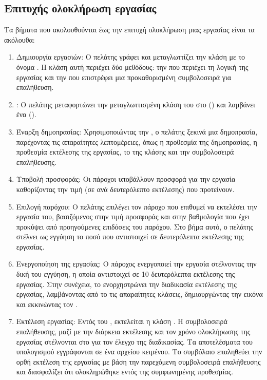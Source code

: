 \subsection{Επιτυχής ολοκλήρωση εργασίας }
Τα βήματα που ακολουθούνται έως την επιτυχή ολοκλήρωση μιας εργασίας είναι τα ακόλουθα:
\begin{enumerate}
    \item Δημιουργία εργασιών: Ο πελάτης γράφει και μεταγλωττίζει την κλάση  με το όνομα \textit{}. Η κλάση αυτή περιέχει δύο  μεθόδους: την \textit{} που περιέχει τη λογική της εργασίας και την \textit{} που επιστρέφει μια προκαθορισμένη συμβολοσειρά για επαλήθευση.
    \item {}: Ο πελάτης μεταφορτώνει την μεταγλωττισμένη κλάση του στο  () και λαμβάνει ένα  ().
    \item Έναρξη δημοπρασίας: Χρησιμοποιώντας την , ο πελάτης ξεκινά μια δημοπρασία, παρέχοντας τις απαραίτητες λεπτομέρειες, όπως η προθεσμία της δημοπρασίας, η προθεσμία εκτέλεσης της εργασίας, το  της  κλάσης και την συμβολοσειρά επαλήθευσης.
    \item Υποβολή προσφοράς: Οι πάροχοι υποβάλλουν προσφορά για την εργασία καθορίζοντας την τιμή (σε  ανά δευτερόλεπτο εκτέλεσης) που προτείνουν.
    \item Επιλογή παρόχου: Ο πελάτης επιλέγει τον πάροχο που επιθυμεί να εκτελέσει την εργασία του, βασιζόμενος στην τιμή προσφοράς και στην βαθμολογία που έχει προκύψει από προηγούμενες επιδόσεις του παρόχου. Στο βήμα αυτό, ο πελάτης στέλνει ως εγγύηση το ποσό που αντιστοιχεί σε  δευτερόλεπτα εκτέλεσης της εργασίας.
    \item Ενεργοποίηση της εργασίας: Ο πάροχος ενεργοποιεί την εργασία στέλνοντας την δική του εγγύηση, η οποία αντιστοιχεί σε 10 δευτερόλεπτα εκτέλεσης της εργασίας. Στην συνέχεια, το  ενορχηστρώνει την διαδικασία εκτέλεσης της εργασίας, λαμβάνοντας από το  τις απαραίτητες κλάσεις, δημιουργώντας την εικόνα \textit{} και εκκινώντας τον .
    \item Εκτέλεση εργασίας: Εντός του , εκτελείται η κλάση . Η συμβολοσειρά επαλήθευσης, μαζί με την διάρκεια εκτέλεσης και τον χρόνο ολοκλήρωσης της εργασίας στέλνονται στο  \textit{} για τον έλεγχο της διαδικασίας. Τα αποτελέσματα του υπολογισμού εγγράφονται σε ένα αρχείου κειμένου. Το συμβόλαιο επαληθεύει την ορθή εκτέλεση της εργασίας με βάση την παρεχόμενη συμβολοσειρά επαλήθευσης και διασφαλίζει ότι ολοκληρώθηκε εντός της συμφωνημένης προθεσμίας.

\end{enumerate}
